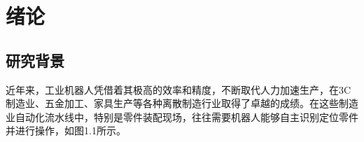 \chapter{绪论}

\section{研究背景}


近年来，工业机器人凭借着其极高的效率和精度，不断取代人力加速生产，在3C制造业、五金加工、家具生产等各种离散制造行业取得了卓越的成绩。在这些制造业自动化流水线中，特别是零件装配现场，往往需要机器人能够自主识别定位零件并进行操作，如图1.1所示。




